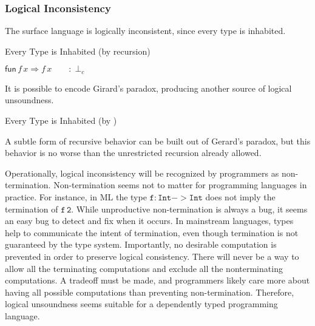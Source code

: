\subsubsection{Logical Inconsistency}

The surface language is logically inconsistent, since every type is inhabited.

\begin{example}
Every Type is Inhabited (by recursion)

$\mathsf{fun}\,f\,x\Rightarrow f\,x\qquad:\perp_{c}$
\end{example}

It is possible to encode Girard's paradox, producing another source of logical unsoundness.
\begin{example}
Every Type is Inhabited (by \tit{})


\end{example}

A subtle form of recursive behavior can be built out of Gerard's paradox\cite{Reinhold89typecheckingis}, but this behavior is no worse than the unrestricted recursion already allowed.


Operationally, logical inconsistency will be recognized by programmers as non-termination.
Non-termination seems not to matter for programming languages in practice.
For instance, in ML the type $\mathtt{f:Int->Int}$ does not imply the termination of $\mathtt{f\,2}$.
While unproductive non-termination is always a bug, it seems an easy bug to detect and fix when it occurs.
In mainstream languages, types help to communicate the intent of termination, even though termination is not guaranteed by the type system.
Importantly, no desirable computation is prevented in order to preserve logical consistency.
There will never be a way to allow all the terminating computations and exclude all the nonterminating computations.
A tradeoff must be made, and programmers likely care more about having all possible computations than preventing non-termination.
Therefore, logical unsoundness seems suitable for a dependently typed programming language.


